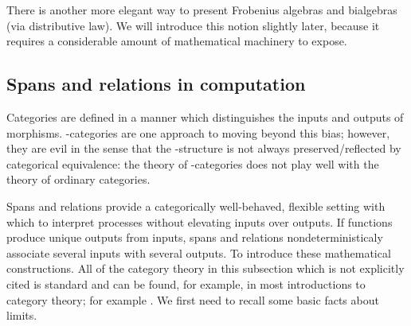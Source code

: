 There is another  more elegant way to present Frobenius algebras and bialgebras (via distributive law).  We will introduce this notion slightly later, because it requires a considerable amount of mathematical machinery to expose.






\subsection{Spans and relations in computation}

Categories are defined in a manner which distinguishes the inputs and outputs of morphisms.  \dag-categories are one approach to moving beyond this bias; however, they are evil in the sense that the \dag-structure is not always preserved/reflected by categorical equivalence: the theory of \dag-categories does not play well with the theory of ordinary categories.  

Spans and relations provide a categorically well-behaved, flexible setting with which to interpret processes without elevating inputs over outputs.
If functions produce unique outputs from inputs, spans and relations nondeterministicaly associate several inputs with several outputs.  To introduce these mathematical constructions.
All of the category theory in this subsection which is not explicitly cited is standard and can be found, for example, in most introductions to category theory; for example \cite{maclane}.
We first need to recall some basic facts about limits.



